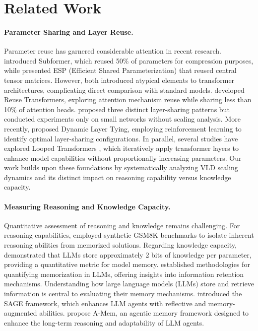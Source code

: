 \documentclass{article} %
\begin{document}
\section{Related Work}
\label{related_work}

\paragraph{Parameter Sharing and Layer Reuse.} 

Parameter reuse has garnered considerable attention in recent research. \citep{reid2021subformer} introduced Subformer, which reused 50\% of parameters for compression purposes, while \citep{liu2023enhancing} presented ESP (Efficient Shared Parameterization) that reused central tensor matrices. However, both introduced atypical elements to transformer architectures, complicating direct comparison with standard models. \citep{bhojanapalli2021leveraging} developed Reuse Transformers, exploring attention mechanism reuse while sharing less than 10\% of attention heads. \citep{takase2021lessons} proposed three distinct layer-sharing patterns but conducted experiments only on small networks without scaling analysis. More recently, \citep{hay2024dynamic} proposed Dynamic Layer Tying, employing reinforcement learning to identify optimal layer-sharing configurations. In parallel, several studies have explored Looped Transformers \citep{fan2024not,saunshi2025reasoning,yang2023looped}, which iteratively apply transformer layers to enhance model capabilities without proportionally increasing parameters. Our work builds upon these foundations by systematically analyzing VLD scaling dynamics and its distinct impact on reasoning capability versus knowledge capacity.


\paragraph{Measuring Reasoning and Knowledge Capacity.} 

Quantitative assessment of reasoning and knowledge remains challenging. For reasoning capabilities, \citep{ye2024physics} employed synthetic GSM8K benchmarks to isolate inherent reasoning abilities from memorized solutions. Regarding knowledge capacity, \citep{allen2024physics} demonstrated that LLMs store approximately 2 bits of knowledge per parameter, providing a quantitative metric for model memory. \citep{carlini2022quantifying} established methodologies for quantifying memorization in LLMs, offering insights into information retention mechanisms. Understanding how large language models (LLMs) store and retrieve information is central to evaluating their memory mechanisms.  \citep{liang2024self} introduced the SAGE framework, which enhances LLM agents with reflective and memory-augmented abilities.  \citep{xu2025mem}  propose A-Mem, an agentic memory framework designed to enhance the long-term reasoning and adaptability of LLM agents. 
\end{document}
